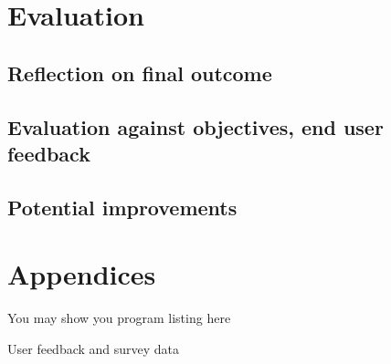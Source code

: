 \documentclass[titlepage]{article}
\begin{document}
\section{Evaluation}

\subsection{Reflection on final outcome}

\subsection{Evaluation against objectives, end user feedback}

\subsection{Potential improvements}

\section{Appendices}

You may show you program listing here

User feedback and survey data
\end{document}
